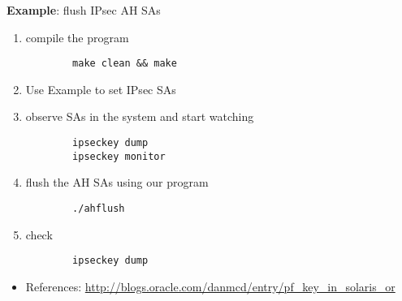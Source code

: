 {\bf Example}: flush IPsec AH SAs
\begin{enumerate}
	 \item compile the program
\begin{verbatim}
	    make clean && make
\end{verbatim}
  	 \item Use Example  to set IPsec SAs
         \item observe SAs in the system and start watching
\begin{verbatim}
	    ipseckey dump
	    ipseckey monitor
\end{verbatim}
	 \item flush the AH SAs using our program
\begin{verbatim}
	    ./ahflush
\end{verbatim}
         \item check
\begin{verbatim}
	    ipseckey dump
\end{verbatim}
\end{enumerate}

\begin{itemize}
  \item References:
    \url{http://blogs.oracle.com/danmcd/entry/pf\_key\_in\_solaris\_or}
\end{itemize}


\endinput
